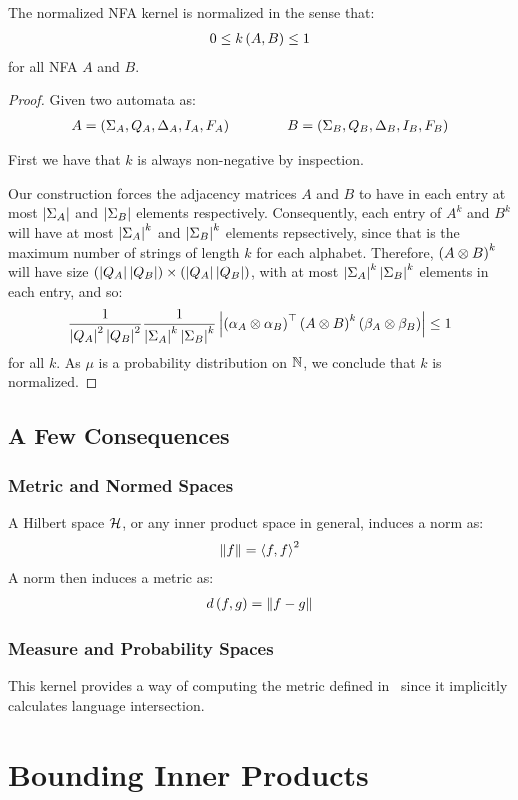 \documentclass[12pt]{article}
\begin{document}
\begin{theorem}
  The normalized NFA kernel is normalized in the sense that:
  \begin{align}
    0 \leq k\left(A, B\right) \leq 1
  \end{align}
  for all NFA \(A\) and \(B\).
\end{theorem}
\begin{proof}
  Given two automata as:
  \begin{align}
    A = \left(\Sigma_A, Q_A, \Delta_A, I_A, F_A\right)
    \qquad \qquad
    B = \left(\Sigma_B, Q_B, \Delta_B, I_B, F_B\right)
  \end{align}

  First we have that \(k\) is always non-negative by inspection.

  Our construction forces the adjacency matrices \(A\) and \(B\)
  to have in each entry at most
  \(\left\lvert\Sigma_A\right\rvert\) and \(\left\lvert\Sigma_B\right\rvert\) elements respectively.
  Consequently, each entry of \(A^k\) and \(B^k\)
  will have at most \(\left\lvert\Sigma_A\right\rvert^k\) and \(\left\lvert\Sigma_B\right\rvert^k\)
  elements repsectively, since that is the maximum number of strings of
  length \(k\) for each alphabet.
  Therefore, \(\left(A \otimes B\right)^k\)
  will have size
  \(\left(\left\lvert Q_A\right\rvert \left\lvert Q_B\right\rvert\right) \times \left(\left\lvert Q_A\right\rvert \left\lvert Q_B\right\rvert\right)\),
  with at most \(\left\lvert\Sigma_A\right\rvert^k \left\lvert\Sigma_B\right\rvert^k\) elements
  in each entry, and so:
  \begin{align}
    \frac{1}{\left\lvert Q_A\right\rvert^2 \left\lvert Q_B\right\rvert^2}
    \frac{1}{\left\lvert\Sigma_A\right\rvert^k \left\lvert\Sigma_B\right\rvert^k}
    \left\lvert\left(\alpha_A \otimes \alpha_B\right)^\top \left(A \otimes B\right)^k \left(\beta_A \otimes \beta_B\right)\right\rvert
      \leq 1
  \end{align}
  for all \(k\).
  As \(\mu\) is a probability distribution on \(\mathbb{N}\),
  we conclude that \(k\) is normalized.

\end{proof}


\subsection{A Few Consequences}


\subsubsection{Metric and Normed Spaces}

A Hilbert space \(\mathcal{H}\), or any inner product space in general,
induces a norm as:
\begin{align}
  \left\lVert f\right\rVert = \left\langle f, f\right\rangle ^2
\end{align}
A norm then induces a metric as:
\begin{align}
  d\left(f, g\right) = \left\lVert f - g\right\rVert
\end{align}


\subsubsection{Measure and Probability Spaces}
This kernel provides a way of computing the metric
defined in~\cite{xue2018measures} since it
implicitly calculates language intersection.



\section{Bounding Inner Products}




\printbibliography
\end{document}
